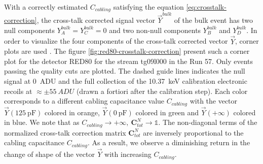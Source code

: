 With a correctly estimated $C_{cabling}$ satisfying the equation \ref{eq:crosstalk-correction}, the cross-talk corrected signal vector $\vec{Y}^{bulk}$ of the bulk event has two null components $Y_A^{bulk} = Y_C^{bulk} = 0$ and two non-null components $Y_B^{bulk}$ and $Y_D^{bulk}$.
In order to visualize the four components of the cross-talk corrected vector $\vec{Y}$, corner plots are used . The figure \ref{fig:red80-crosstalk-correction} present such a corner plot for the detector RED80 for the stream tg09l000 in the Run 57. Only events passing the quality cuts are plotted. The dashed guide lines indicates the null signal at \SI{0}{ADU} and the full collection of the \SI{10.37}{\kilo\eV} calibration electronic recoils  at $\approx \pm \SI{55}{ADU}$ (drawn a fortiori after the calibration step).
Each color corresponds to a different cabling capacitance value $C_{cabling}$ with the vector $\vec{Y}(\SI{125}{\pico\farad})$ colored in orange, $\vec{Y}(\SI{0}{\pico\farad})$ colored in green and $\vec{Y}(+\infty)$ colored in blue. We note that as $C_{cabling} \rightarrow +\infty, \ \bm{C}_{tot}^N \rightarrow \mathbb{1}$. The non-diagonal terms of the normalized cross-talk correction matrix $\bm{C}_{tot}^N$ are inversely proportional to the cabling capacitance $C_{cabling}$. As a result, we observe a diminishing return in the change of shape of the vector $\vec{Y}$ with increasing $C_{cabling}$.

